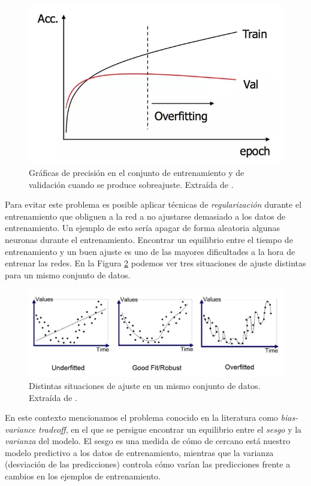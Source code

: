 \documentclass[
  a4paper,
  12pt,
  spanish,
]{scrartcl}
\theoremstyle{teorema-style}
\begin{document}
\begin{figure}[h]
  \centering
  \includegraphics[width=.7\textwidth]{img/overfitting}
  \caption{Gráficas de precisión en el conjunto de entrenamiento y de validación cuando se produce sobreajuste. Extraída de \parencite{quora_overfitting_2016}.}
  \label{fig:overfitting}
\end{figure}

Para evitar este problema es posible aplicar técnicas de \textit{regularización} durante el entrenamiento que obliguen a la red a no ajustarse demasiado a los datos de entrenamiento. Un ejemplo de esto sería apagar de forma aleatoria algunas neuronas durante el entrenamiento. Encontrar un equilibrio entre el tiempo de entrenamiento y un buen ajuste es uno de las mayores dificultades a la hora de entrenar las redes. En la Figura \ref{fig:fit} podemos ver tres situaciones de ajuste distintas para un mismo conjunto de datos.

\begin{figure}[h]
  \centering
  \includegraphics[width=.7\textwidth]{img/fit}
  \caption{Distintas situaciones de ajuste en un mismo conjunto de datos. Extraída de \parencite{bhande_fit_2018}.}
  \label{fig:fit}
\end{figure}

En este contexto mencionamos el problema conocido en la literatura como \textit{bias-variance tradeoff}, en el que se persigue encontrar un equilibrio entre el \textit{sesgo} y la \textit{varianza} del modelo. El sesgo es una medida de cómo de cercano está nuestro modelo predictivo a los datos de entrenamiento, mientras que la varianza (desviación de las predicciones) controla cómo varían las predicciones frente a cambios en los ejemplos de entrenamiento.
\end{document}
